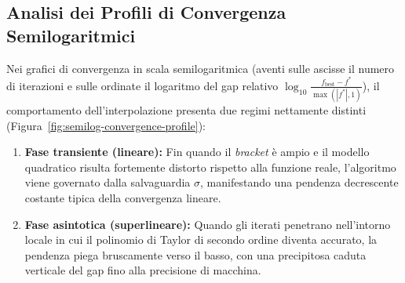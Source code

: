 \subsection{Analisi dei Profili di Convergenza Semilogaritmici}
Nei grafici di convergenza in scala semilogaritmica (aventi sulle ascisse il numero di iterazioni e sulle ordinate il logaritmo del gap relativo $\log_{10} \frac{f_{\text{best}} - f^*}{\max(|f^*|, 1)}$), il comportamento dell'interpolazione presenta due regimi nettamente distinti (Figura~\ref{fig:semilog-convergence-profile}):
\begin{enumerate}
    \item \textbf{Fase transiente (lineare):} Fin quando il \textit{bracket} \`e ampio e il modello quadratico risulta fortemente distorto rispetto alla funzione reale, l'algoritmo viene governato dalla salvaguardia $\sigma$, manifestando una pendenza decrescente costante tipica della convergenza lineare.
    \item \textbf{Fase asintotica (superlineare):} Quando gli iterati penetrano nell'intorno locale in cui il polinomio di Taylor di secondo ordine diventa accurato, la pendenza piega bruscamente verso il basso, con una precipitosa caduta verticale del gap fino alla precisione di macchina.
\end{enumerate}

